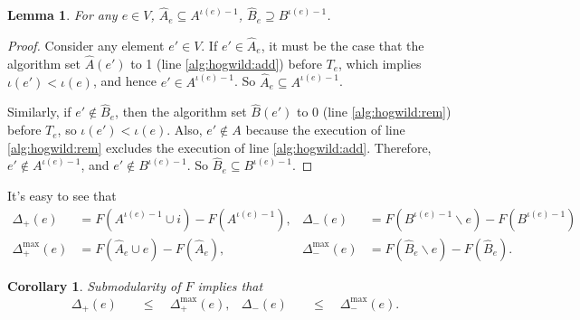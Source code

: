 \documentclass{article} %
\newtheorem{cor}[thm]{Corollary}
\newtheorem{lem}[thm]{Lemma}
\begin{document}
\begin{lem}\label{lem:set_bound} For any $e\in V$, $\hat{A}_e \subseteq A^{\iota(e)-1}$, $\hat{B}_e \supseteq B^{\iota(e)-1}$.
\end{lem}
\begin{proof}
Consider any element $e'\in V$.
If $e'\in \hat{A}_e$, it must be the case that the algorithm set $\hat{A}(e')$ to 1 (line \ref{alg:hogwild:add}) before $T_e$, which implies $\iota(e') < \iota(e)$, and hence $e' \in A^{\iota(e)-1}$.
So $\hat{A}_e \subseteq A^{\iota(e)-1}$.

Similarly, if $e'\not\in \hat{B}_e$, then the algorithm set $\hat{B}(e')$ to 0 (line \ref{alg:hogwild:rem}) before $T_e$, so $\iota(e') < \iota(e)$.
Also, $e'\not\in A$ because the execution of line \ref{alg:hogwild:rem} excludes the execution of line \ref{alg:hogwild:add}.
Therefore, $e'\not\in A^{\iota(e)-1}$, and $e'\not\in B^{\iota(e)-1}$.
So $\hat{B}_e \subseteq B^{\iota(e)-1}$.
\end{proof}

It's easy to see that
\begin{align*}
  \Delta_{+}       (e) &= F(A^{\iota(e)-1}\cup i) - F(A^{\iota(e)-1}),
& \Delta_{-}       (e) &= F(B^{\iota(e)-1}\backslash e) - F(B^{\iota(e)-1})\\
  \Delta_{+}^{\max}(e) &= F(\hat{A}_e\cup e) - F(\hat{A}_e),
& \Delta_{-}^{\max}(e) &= F(\hat{B}_e\backslash e) - F(\hat{B}_e).
\end{align*}

\begin{cor}\label{cor:delta_bound}
Submodularity of $F$ implies that
\begin{align*}
  \Delta_{+}(e) &\quad\leq\quad \Delta_{+}^{\max}(e),
& \Delta_{-}(e) &\quad\leq\quad \Delta_{-}^{\max}(e).
\end{align*}
\end{cor}
\end{document}
